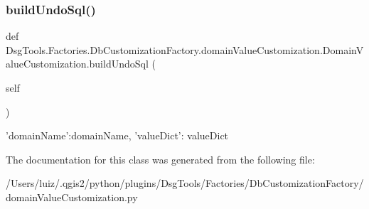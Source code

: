 \subsubsection{\texorpdfstring{build\+Undo\+Sql()}{buildUndoSql()}}
{\footnotesize\ttfamily def Dsg\+Tools.\+Factories.\+Db\+Customization\+Factory.\+domain\+Value\+Customization.\+Domain\+Value\+Customization.\+build\+Undo\+Sql (\begin{DoxyParamCaption}\item[{}]{self }\end{DoxyParamCaption})}

\begin{DoxyVerb}{'domainName':domainName, 'valueDict': valueDict}
\end{DoxyVerb}
 

The documentation for this class was generated from the following file\+:\begin{DoxyCompactItemize}
\item 
/\+Users/luiz/.\+qgis2/python/plugins/\+Dsg\+Tools/\+Factories/\+Db\+Customization\+Factory/domain\+Value\+Customization.\+py\end{DoxyCompactItemize}

